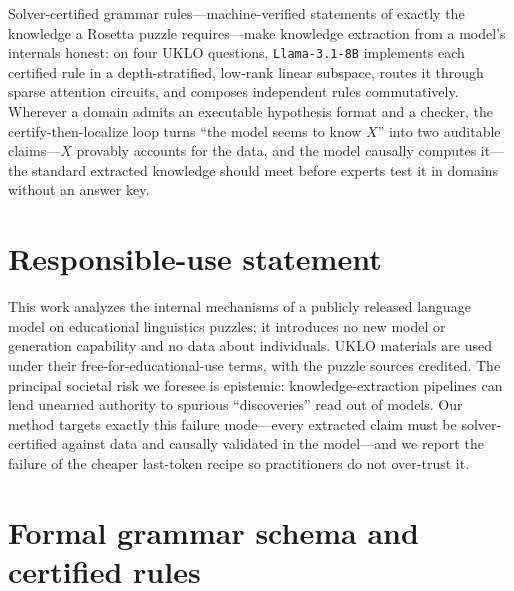 \documentclass{article}
\begin{document}
Solver-certified grammar rules---machine-verified statements of exactly the
knowledge a Rosetta puzzle requires---make knowledge extraction from a model's
internals honest: on four UKLO questions, \texttt{Llama-3.1-8B} implements
each certified rule in a depth-stratified, low-rank linear subspace, routes it
through sparse attention circuits, and composes independent rules
commutatively. Wherever a domain admits an executable hypothesis format and a
checker, the certify-then-localize loop turns ``the model seems to know $X$''
into two auditable claims---$X$ provably accounts for the data, and the model
causally computes it---the standard extracted knowledge should meet before
experts test it in domains without an answer key.

\section*{Responsible-use statement}
This work analyzes the internal mechanisms of a publicly released language
model on educational linguistics puzzles; it introduces no new model or
generation capability and no data about individuals. UKLO materials are used
under their free-for-educational-use terms, with the puzzle sources credited.
The principal societal risk we foresee is epistemic: knowledge-extraction
pipelines can lend unearned authority to spurious ``discoveries'' read out of
models. Our method targets exactly this failure mode---every extracted claim
must be solver-certified against data and causally validated in the
model---and we report the failure of the cheaper last-token recipe so
practitioners do not over-trust it.

\begingroup
\small


\endgroup

\appendix


\section{Formal grammar schema and certified rules}
\label{app:schema}
\end{document}
